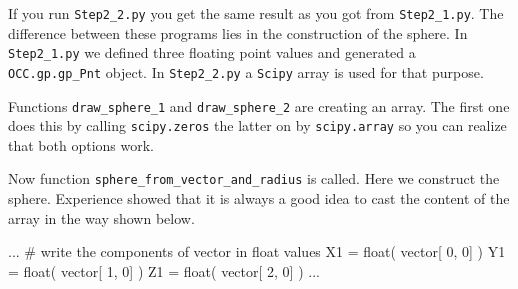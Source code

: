 If you run {\tt Step2\_2.py} you get the same result as you got from {\tt Step2\_1.py}.
The difference between these programs lies in the construction of the sphere.
In {\tt Step2\_1.py} we defined three floating point values and generated a {\tt \tt OCC.gp.gp\_Pnt} object.
In {\tt Step2\_2.py} a {\tt Scipy} array is used for that purpose.

Functions {\tt draw\_sphere\_1} and  {\tt draw\_sphere\_2} are creating an array.
The first one does this by calling {\tt scipy.zeros} the latter on by {\tt scipy.array} so you can realize that both options work.

Now function {\tt sphere\_from\_vector\_and\_radius} is called.
Here we construct the sphere.
Experience showed that it is always a good idea to cast the content of the array in the way shown below.
\begin{python}
...    
    # write the components of vector in float values
    X1 = float( vector[ 0, 0] )
    Y1 = float( vector[ 1, 0] )
    Z1 = float( vector[ 2, 0] )
...    
\end{python}
